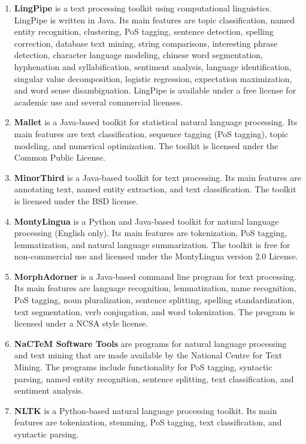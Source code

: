 \documentclass[a4paper,twoside]{book}      %
\begin{document}
\begin{enumerate}
\item \textbf{LingPipe} \cite{lingpipe} is a text processing toolkit using computational linguistics. LingPipe is written in Java. Its main features are topic classification, named entity recognition, clustering, PoS tagging, sentence detection, spelling correction, database text mining, string comparisons, interesting phrase detection, character language modeling, chinese word segmentation, hyphenation and syllabification, sentiment analysis, language identification, singular value decomposition, logistic regression, expectation maximization, and word sense disambiguation.
LingPipe is available under a free license for academic use and several commercial licenses.
\item \textbf{Mallet} \cite{mccallum2002mallet} is a Java-based toolkit for statistical natural language processing. Its main features are text classification, sequence tagging (PoS tagging), topic modeling, and numerical optimization.
The toolkit is licensed under the Common Public License.
\item \textbf{MinorThird} \cite{cohen2004minorthird} is a Java-based toolkit for text processing. Its main features are annotating text, named entity extraction, and text classification.
The toolkit is licensed under the BSD license.
\item \textbf{MontyLingua} \cite{liu2004montylingua} is a Python and Java-based toolkit for natural language processing (English only). Its main features are tokenization, PoS tagging, lemmatization, and natural language summarization.
The toolkit is free for non-commercial use and licensed under the MontyLingua version 2.0 License.
\item \textbf{MorphAdorner} \cite{morphadorner} is a Java-based command line program for text processing. Its main features are language recognition, lemmatization, name recognition, PoS tagging, noun pluralization, sentence splitting, spelling standardization, text segmentation, verb conjugation, and word tokenization.
The program is licensed under a NCSA style license.
\item \textbf{NaCTeM Software Tools} \cite{nactem} are programs for natural language processing and text mining that are made available by the National Centre for Text Mining. The programs include functionality for PoS tagging, syntactic parsing, named entity recognition, sentence splitting, text classification, and sentiment analysis.
\item \textbf{NLTK} \cite{loper2002nltk} is a Python-based natural language processing toolkit. Its main features are tokenization, stemming, PoS tagging, text classification, and syntactic parsing.

\end{enumerate}
\end{document}
